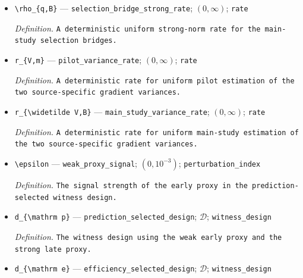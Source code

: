 \documentclass{article}
\begin{document}
\begin{itemize}
  \par\smallskip\noindent\emph{Definition.} \texttt{A deterministic uniform weak-\allowbreak{}seminorm rate for the main-\allowbreak{}study selection bridges.}
  \item \texttt{\textbackslash{}\allowbreak{}rho\_\allowbreak{}\{q,\allowbreak{}B\}\allowbreak{}} --- \texttt{selection\_\allowbreak{}bridge\_\allowbreak{}strong\_\allowbreak{}rate}; \((0,\infty)\); \texttt{rate}
  \par\smallskip\noindent\emph{Definition.} \texttt{A deterministic uniform strong-\allowbreak{}norm rate for the main-\allowbreak{}study selection bridges.}
  \item \texttt{r\_\allowbreak{}\{V,\allowbreak{}m\}\allowbreak{}} --- \texttt{pilot\_\allowbreak{}variance\_\allowbreak{}rate}; \((0,\infty)\); \texttt{rate}
  \par\smallskip\noindent\emph{Definition.} \texttt{A deterministic rate for uniform pilot estimation of the two source-\allowbreak{}specific gradient variances.}
  \item \texttt{r\_\allowbreak{}\{\textbackslash{}\allowbreak{}widetilde V,\allowbreak{}B\}\allowbreak{}} --- \texttt{main\_\allowbreak{}study\_\allowbreak{}variance\_\allowbreak{}rate}; \((0,\infty)\); \texttt{rate}
  \par\smallskip\noindent\emph{Definition.} \texttt{A deterministic rate for uniform main-\allowbreak{}study estimation of the two source-\allowbreak{}specific gradient variances.}
  \item \texttt{\textbackslash{}\allowbreak{}epsilon} --- \texttt{weak\_\allowbreak{}proxy\_\allowbreak{}signal}; \((0,10^{-3})\); \texttt{perturbation\_\allowbreak{}index}
  \par\smallskip\noindent\emph{Definition.} \texttt{The signal strength of the early proxy in the prediction-\allowbreak{}selected witness design.}
  \item \texttt{d\_\allowbreak{}\{\textbackslash{}\allowbreak{}mathrm p\}\allowbreak{}} --- \texttt{prediction\_\allowbreak{}selected\_\allowbreak{}design}; \(\mathcal D\); \texttt{witness\_\allowbreak{}design}
  \par\smallskip\noindent\emph{Definition.} \texttt{The witness design using the weak early proxy and the strong late proxy.}
  \item \texttt{d\_\allowbreak{}\{\textbackslash{}\allowbreak{}mathrm e\}\allowbreak{}} --- \texttt{efficiency\_\allowbreak{}selected\_\allowbreak{}design}; \(\mathcal D\); \texttt{witness\_\allowbreak{}design}

\end{itemize}
\end{document}
